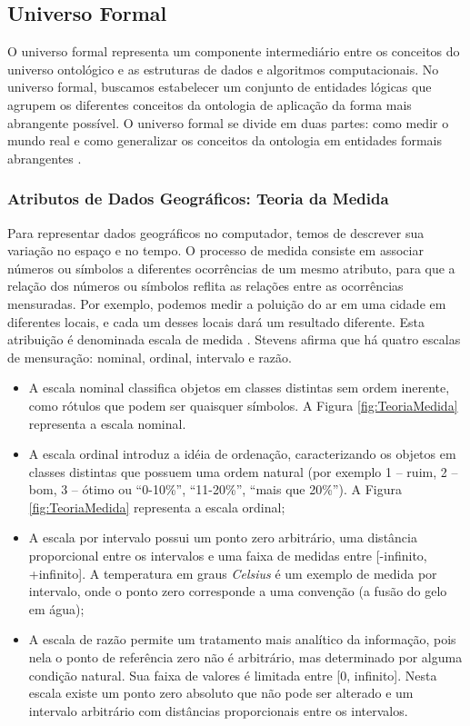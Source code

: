 \subsection{Universo Formal}

O universo formal representa um componente intermediário entre os conceitos do universo ontológico e as estruturas de dados e algoritmos computacionais. No universo formal, buscamos estabelecer um conjunto de entidades lógicas que agrupem os diferentes conceitos da ontologia de aplicação da forma mais abrangente possível. O universo formal se divide em duas partes: como medir o mundo real e como generalizar os conceitos da ontologia em entidades formais abrangentes \cite{queirozferreira}.

\subsubsection{Atributos de Dados Geográficos: Teoria da Medida}

Para representar dados geográficos no computador, temos de descrever sua variação no espaço e no tempo. O processo de medida consiste em associar números ou símbolos a diferentes ocorrências de um mesmo atributo, para que a relação dos números ou símbolos reflita as relações entre as ocorrências mensuradas. Por exemplo, podemos medir a poluição do ar em uma cidade em diferentes locais, e cada um desses locais dará um resultado diferente. Esta atribuição é denominada escala de medida \cite{queirozferreira}. Stevens  afirma que há quatro escalas de mensuração: nominal, ordinal, intervalo e razão.

\begin{itemize}
\item A escala nominal classifica objetos em classes distintas sem ordem inerente, como rótulos que podem ser quaisquer símbolos. A Figura \ref{fig:TeoriaMedida} representa a escala nominal.
\item A escala ordinal introduz a idéia de ordenação, caracterizando os objetos em classes distintas que possuem uma ordem natural (por exemplo 1 – ruim, 2 – bom, 3 – ótimo ou “0-10\%”, “11-20\%”, “mais que 20\%”). A Figura \ref{fig:TeoriaMedida} representa a escala ordinal;
\item A escala por intervalo possui um ponto zero arbitrário, uma distância proporcional entre os intervalos e uma faixa de medidas entre [-infinito, +infinito]. A temperatura em graus \textit{Celsius} é um exemplo de medida por intervalo, onde o ponto zero corresponde a uma convenção (a fusão do gelo em água);
\item A escala de razão permite um tratamento mais analítico da informação, pois nela o ponto de referência zero não é arbitrário, mas determinado por alguma condição natural. Sua faixa de valores é limitada entre [0, infinito]. Nesta escala existe um ponto zero absoluto que não pode ser alterado e um intervalo arbitrário com distâncias proporcionais entre os intervalos.
\end{itemize}

